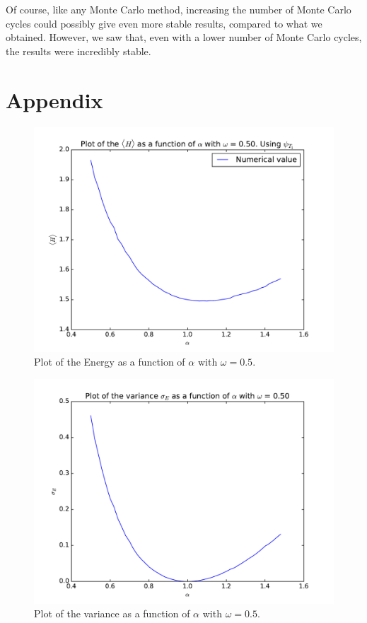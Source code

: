 \documentclass[12pt]{article}
\begin{document}
Of course, like any Monte Carlo method, increasing the number of Monte Carlo cycles could possibly give even more stable results, compared to what we obtained. However, we saw that, even with a lower number of Monte Carlo cycles, the results were incredibly stable.
\FloatBarrier
\section{Appendix}
\begin{figure}[h]
\centering
\includegraphics[width=\linewidth]{Plots/Energy_alpha_plot_omega05.pdf}
\caption{Plot of the Energy as a function of $\alpha$ with $\omega = 0.5$.}
\label{fig:Energy_alpha_omega05}

\end{figure}
\begin{figure}[h]
\centering
\includegraphics[width=\linewidth]{Plots/Variance_alpha_plot_omega05.pdf}
\caption{Plot of the variance as a function of $\alpha$ with $\omega = 0.5$.}
\label{fig:Variance_alpha_omega05}
\end{figure}
\end{document}
